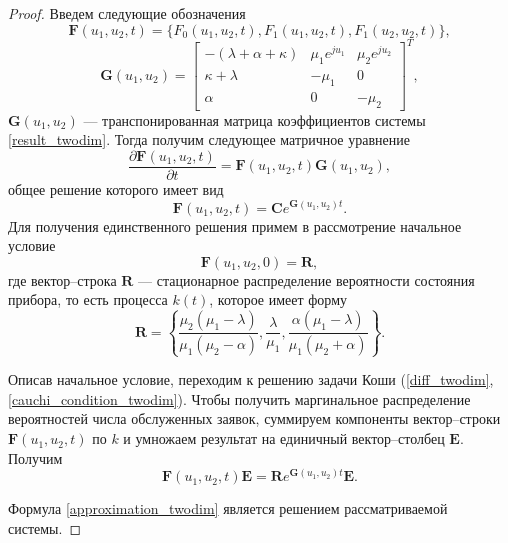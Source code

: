 \begin{proof}
	Введем следующие обозначения
	\begin{equation*}
		\boldsymbol{F}(u_{1},u_{2},t) = \{F_{0}(u_{1},u_{2},t),F_{1}(u_{1},u_{2},t),F_{1}(u_{2},u_{2},t)\},
	\end{equation*}  
	\begin{equation*}
		\boldsymbol{G}(u_{1},u_{2})=\begin{bmatrix}
			-(\lambda + \alpha + \kappa) & \mu_{1}e^{ju_{1}} &  \mu_{2}e^{ju_{2}}\\
			\kappa+\lambda & -\mu_{1} & 0\\
			\alpha & 	0 &	-\mu_{2}
		\end{bmatrix}^{T},
	\end{equation*}
	$\boldsymbol{G}(u_{1},u_{2})$ --- транспонированная матрица коэффициентов системы \eqref{result_twodim}.
	Тогда получим следующее матричное уравнение
	\begin{equation*}
		\frac{{\partial \boldsymbol{F}(u_{1},u_{2},t)}}{{\partial t}} =\boldsymbol{F}(u_{1},u_{2},t)\boldsymbol{G}(u_{1},u_{2}),
	\end{equation*}
	общее решение которого имеет вид
	\begin{equation} \label{diff_twodim}
		\boldsymbol{F}(u_{1},u_{2},t)=\boldsymbol{C}e^{\boldsymbol{G}(u_{1},u_{2})t}.
	\end{equation}
	Для получения единственного решения примем в рассмотрение начальное условие
	\begin{equation} \label{cauchi_condition_twodim}
		\boldsymbol{F}(u_{1},u_{2},0)=\boldsymbol{R},
	\end{equation}
	где вектор--строка $\boldsymbol{R}$ --- стационарное распределение вероятности состояния прибора, то есть процесса $k(t)$, которое имеет форму \cite{nazarov2017asymptotic}
	\begin{equation*}
		\boldsymbol{R}=\left\{\frac{\mu_{2}(\mu_{1} - \lambda)}{\mu_{1}(\mu_{2} - \alpha)},\frac{\lambda}{\mu_{1}},\frac{\alpha(\mu_{1} - \lambda)}{\mu_{1}(\mu_{2} + \alpha)}\right\}.
	\end{equation*}

	Описав начальное условие, переходим к решению задачи Коши (\ref{diff_twodim}, \ref{cauchi_condition_twodim}).
	Чтобы получить маргинальное распределение вероятностей числа обслуженных заявок, суммируем компоненты вектор--строки $\boldsymbol{F}(u_{1},u_{2},t)$ по $k$ и умножаем результат на единичный вектор--столбец $\boldsymbol{E}$. Получим
	\begin{equation}\label{approximation_twodim}
		\boldsymbol{F}(u_{1},u_{2},t)\boldsymbol{E}=\boldsymbol{R}e^{\boldsymbol{G}(u_{1},u_{2})t}\boldsymbol{E}.
	\end{equation}

	Формула \eqref{approximation_twodim} является решением рассматриваемой системы. 
\end{proof}

